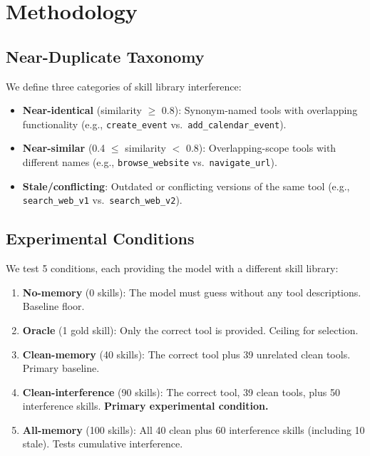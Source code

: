 \documentclass[11pt]{article}
\begin{document}
\section{Methodology}

\subsection{Near-Duplicate Taxonomy}

We define three categories of skill library interference:

\begin{itemize}
    \item \textbf{Near-identical} (similarity $\geq$ 0.8): Synonym-named tools with overlapping functionality (e.g., \texttt{create\_event} vs.\ \texttt{add\_calendar\_event}).
    \item \textbf{Near-similar} (0.4 $\leq$ similarity $<$ 0.8): Overlapping-scope tools with different names (e.g., \texttt{browse\_website} vs.\ \texttt{navigate\_url}).
    \item \textbf{Stale/conflicting}: Outdated or conflicting versions of the same tool (e.g., \texttt{search\_web\_v1} vs.\ \texttt{search\_web\_v2}).
\end{itemize}

\subsection{Experimental Conditions}

We test 5 conditions, each providing the model with a different skill library:

\begin{enumerate}
    \item \textbf{No-memory} (0 skills): The model must guess without any tool descriptions. Baseline floor.
    \item \textbf{Oracle} (1 gold skill): Only the correct tool is provided. Ceiling for selection.
    \item \textbf{Clean-memory} (40 skills): The correct tool plus 39 unrelated clean tools. Primary baseline.
    \item \textbf{Clean-interference} (90 skills): The correct tool, 39 clean tools, plus 50 interference skills. \textbf{Primary experimental condition.}
    \item \textbf{All-memory} (100 skills): All 40 clean plus 60 interference skills (including 10 stale). Tests cumulative interference.
\end{enumerate}
\end{document}

